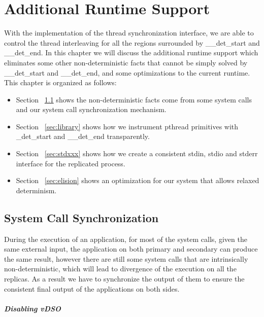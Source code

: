 \chapter{Additional Runtime Support}
With the implementation of the thread synchronization interface, we are able to control the thread interleaving for all the regions surrounded by \_\_det\_start and \_\_det\_end. In this chapter we will discuss the additional runtime support which eliminates some other non-deterministic facts that cannot be simply solved by \_\_det\_start and \_\_det\_end, and some optimizations to the current runtime. This chapter is organized as follows:

\begin{itemize}
  \item Section ~\ref{sec:syscall} shows the non-deterministic facts come from some system calls and our system call synchronization mechanism.
  \item Section ~\ref{sec:library} shows how we instrument pthread primitives with \_det\_start and \_\_det\_end transparently.
  \item Section ~\ref{sec:stdxxx} shows how we create a consistent stdin, stdio and stderr interface for the replicated process.
  \item Section ~\ref{sec:elision} shows an optimization for our system that allows relaxed determinism.
\end{itemize}

\section{System Call Synchronization} \label{sec:syscall}
During the execution of an application, for most of the system calls, given the same external input, the application on both primary and secondary can produce the same result, however there are still some system calls that are intrinsically non-deterministic, which will lead to divergence of the execution on all the replicas. As a result we have to synchronize the output of them to ensure the consistent final output of the applications on both sides.

\paragraph{Disabling vDSO}


